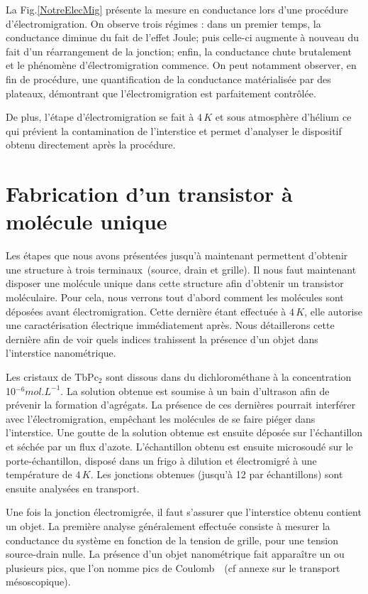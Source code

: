 La Fig.\ref{NotreElecMig} présente la mesure en conductance lors d'une procédure d'électromigration. On observe trois régimes : dans un premier temps, la conductance diminue du fait de l'effet Joule; puis celle-ci augmente à nouveau du fait d'un réarrangement de la jonction; enfin, la conductance chute brutalement et le phénomène d'électromigration commence. On peut notamment observer, en fin de procédure, une quantification de la conductance matérialisée par des plateaux, démontrant que l'électromigration est parfaitement contrôlée.

De plus, l'étape d'électromigration se fait à $4\,K$ et sous atmosphère d'hélium ce qui prévient la contamination de l'interstice et permet d'analyser le dispositif obtenu directement après la procédure.

\section{Fabrication d'un transistor à molécule unique}
Les étapes que nous avons présentées jusqu'à maintenant permettent d'obtenir une structure à trois terminaux~(source, drain et grille). Il nous faut maintenant disposer une molécule unique dans cette structure afin d'obtenir un transistor moléculaire. Pour cela, nous verrons tout d'abord comment les molécules sont déposées avant électromigration. Cette dernière étant effectuée à $4\,K$, elle autorise une caractérisation électrique immédiatement après. Nous détaillerons cette dernière afin de voir quels indices trahissent la présence d'un objet dans l'interstice nanométrique.

Les cristaux de TbPc$_{2}$ sont dissous dans du dichlorométhane à la concentration 10$^{-6}mol.L^{-1}$. La solution obtenue est soumise à un bain d'ultrason afin de prévenir la formation d'agrégats. La présence de ces dernières pourrait interférer avec l'électromigration, empêchant les molécules de se faire piéger dans l'interstice. Une goutte de la solution obtenue est ensuite déposée sur l'échantillon et séchée par un flux d'azote. L'échantillon obtenu est ensuite microsoudé sur le porte-échantillon, disposé dans un frigo à dilution et électromigré à une température de  $4\,K$. Les jonctions obtenues (jusqu'à 12 par échantillons) sont ensuite analysées en transport.

Une fois la jonction électromigrée, il faut s'assurer que l'interstice obtenu contient un objet. La première analyse généralement effectuée consiste à mesurer la conductance du système en fonction de la tension de grille, pour une tension source-drain nulle. La présence d'un objet nanométrique fait apparaître un ou plusieurs pics, que l'on nomme pics de Coulomb~\cite{Beenakker1991,Wiel2002,Hanson2007}~(cf annexe sur le transport mésoscopique). 

